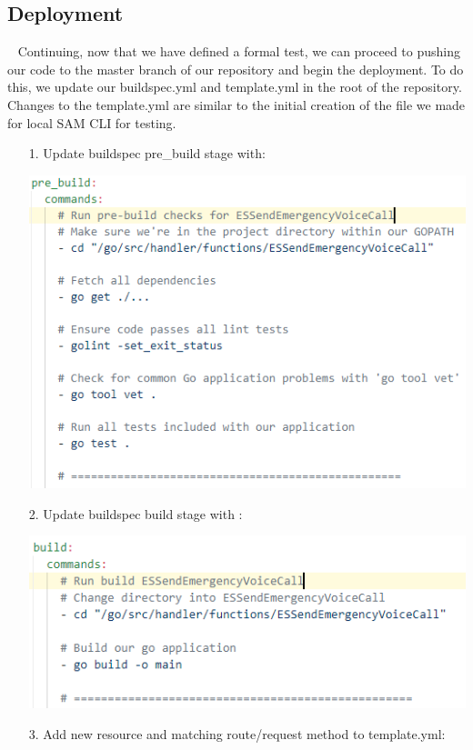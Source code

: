\documentclass[10pt, a4paper]{article}
\begin{document}
\subsection{Deployment}
\par ~ Continuing, now that we have defined a formal test, we can proceed to pushing our code to the master branch of our repository and begin the deployment. To do this, we update our buildspec.yml and template.yml in the root of the repository. Changes to the template.yml are similar to the initial creation of the file we made for local SAM CLI for testing. 
\begin{enumerate}
	\item[1.] Update buildspec pre\_build stage with:
	\begin{center}
		\includegraphics[scale=1]{code-screenshots/pre-build.PNG}
	\end{center}
	\item[2.] Update buildspec build stage with :
	\begin{center}
		\includegraphics[scale=1]{code-screenshots/build.PNG}
	\end{center}
	\item[3.] Add new resource and matching route/request method to template.yml:

\end{enumerate}
\end{document}

